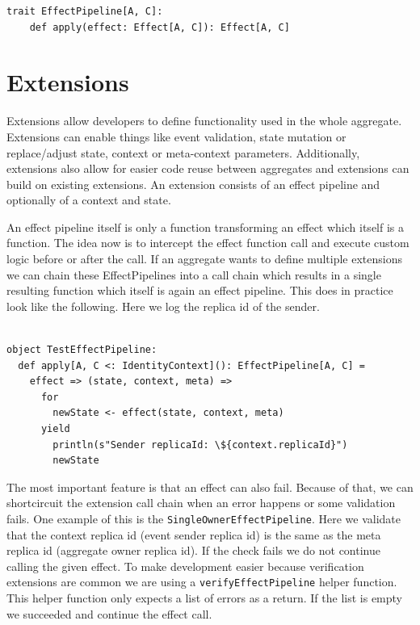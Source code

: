 \documentclass[
	english,
	ruledheaders=section,   %
	class=report,		    %
	thesis={type=bachelor}, %
	accentcolor=9c,			%
	custommargins=true,    %
	marginpar=false,        %
	parskip=half-,          %
	fontsize=11pt,          %
]{tudapub}
\begin{document}
\begin{lstlisting}
trait EffectPipeline[A, C]:
	def apply(effect: Effect[A, C]): Effect[A, C]
\end{lstlisting}

\section{Extensions}
Extensions allow developers to define functionality used in the whole aggregate. Extensions can enable things like event validation, state mutation or replace/adjust state, context or meta-context parameters. Additionally, extensions also allow for easier code reuse between aggregates and extensions can build on existing extensions. An extension consists of an effect pipeline and optionally of a context and state. 

An effect pipeline itself is only a function transforming an effect which itself is a function. The idea now is to intercept the effect function call and execute custom logic before or after the call. If an aggregate wants to define multiple extensions we can chain these EffectPipelines into a call chain which results in a single resulting function which itself is again an effect pipeline. This does in practice look like the following. Here we log the replica id of the sender.

\begin{lstlisting}

object TestEffectPipeline:
  def apply[A, C <: IdentityContext](): EffectPipeline[A, C] =
    effect => (state, context, meta) => 
      for
        newState <- effect(state, context, meta)
      yield
        println(s"Sender replicaId: \${context.replicaId}")
        newState

\end{lstlisting}

The most important feature is that an effect can also fail. Because of that, we can shortcircuit the extension call chain when an error happens or some validation fails. One example of this is the \texttt{SingleOwnerEffectPipeline}. Here we validate that the context replica id (event sender replica id) is the same as the meta replica id (aggregate owner replica id). If the check fails we do not continue calling the given effect. To make development easier because verification extensions are common we are using a \texttt{verifyEffectPipeline} helper function. This helper function only expects a list of errors as a return. If the list is empty we succeeded and continue the effect call.
\end{document}
